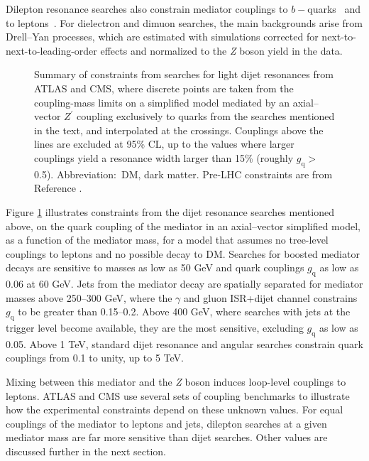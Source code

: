 \documentclass{ar-1col}
\newcommand{\gq}{$g_{\mathrm{q}}$\xspace}
\begin{document}
Dilepton resonance searches also constrain mediator couplings to $b-$quarks~\cite{Aaboud:2018tqo} and to
leptons~\cite{Aaboud:2017buh,Khachatryan:2016zqb}. For dielectron
and dimuon searches, the main backgrounds arise from Drell--Yan
processes, which are estimated with simulations corrected for next-to-next-to-leading-order
effects and normalized to the \textit{Z} boson yield in the data.

\begin{figure}[!htpb]
\caption{Summary of constraints from searches for light dijet
resonances from ATLAS and CMS, where discrete points are taken
from the coupling-mass limits on a simplified model mediated by an
axial--vector $Z^\prime$ coupling exclusively to quarks from the
searches mentioned in the text, and interpolated at the crossings.
Couplings above the lines are excluded at 95\% CL, up to the
values where larger couplings yield a resonance width larger than
15\% (roughly \gq $>$ 0.5). Abbreviation:\ DM, dark matter. Pre-LHC constraints are from Reference .}\label{fig:couplingmass}
\end{figure}

Figure \ref{fig:couplingmass} illustrates constraints from the
dijet resonance searches mentioned above, on the quark coupling of
the mediator in an axial--vector simplified model, as a function of
the mediator mass, for a model that assumes no tree-level
couplings to leptons and no possible decay to DM. Searches for
boosted mediator decays are sensitive to masses as low as 50 GeV
and quark couplings \gq as low as 0.06 at 60 GeV. Jets from the
mediator decay are spatially separated for mediator masses above
250--300 GeV, where the $\gamma$ and gluon ISR+dijet channel
constrains \gq to be greater than 0.15--0.2. Above 400 GeV, where searches with
jets at the trigger level become available, they are the most
sensitive, excluding \gq as low as 0.05. Above 1 TeV, standard
dijet resonance and angular searches constrain quark couplings
from 0.1 to unity, up to 5 TeV.

Mixing between this mediator and the \textit{Z} boson induces loop-level
couplings to leptons. ATLAS and CMS use several sets of coupling
benchmarks to illustrate how the experimental constraints depend
on these unknown values. For equal couplings of the mediator to
leptons and jets, dilepton searches at a given mediator mass are
far more sensitive than dijet searches. Other values are
discussed further in the next section.
\end{document}
